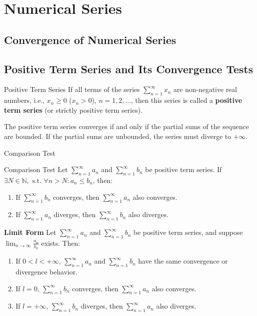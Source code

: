 \documentclass[11pt]{../../TexTemplate/elegantbook}
\begin{document}
\chapter{Numerical Series}
\section{Convergence of Numerical Series}

\section{Positive Term Series and Its Convergence Tests}
\begin{definition}{Positive Term Series}
    If all terms of the series \( \sum_{n=1}^{\infty} x_n \) are non-negative real numbers, 
    i.e., \( x_n \geqslant 0 \) (\( x_n > 0 \)), \( n = 1, 2, \dots \), 
    then this series is called a \textbf{positive term series} (or strictly positive term series).
\end{definition}

\begin{note}
    The positive term series converges if and only if the partial sums of the sequence are bounded. 
    If the partial sums are unbounded, the series must diverge to \( +\infty \).
\end{note}

\begin{leftbarTitle}{Comparison Test}\end{leftbarTitle}
\begin{theorem}{Comparison Test}
    Let \( \sum_{n=1}^{\infty} a_n \) and \( \sum_{n=1}^{\infty} b_n \) be positive term series. 
    If \( \exists N \in \mathbb{N}, \text{ s.t. } \forall n > N: a_n \leqslant b_n \), then:
    \begin{enumerate}
        \item If \( \sum_{n=1}^{\infty} b_n \) converges, then \( \sum_{n=1}^{\infty} a_n \) also converges.
        \item If \( \sum_{n=1}^{\infty} a_n \) diverges, then \( \sum_{n=1}^{\infty} b_n \) also diverges.
    \end{enumerate}

    \textbf{Limit Form}
    Let \( \sum_{n=1}^{\infty} a_n \) and \( \sum_{n=1}^{\infty} b_n \) be positive term series, 
    and suppose \( \lim_{n \to \infty} \frac{a_n}{b_n} \) exists. Then:

    \begin{enumerate}
        \item If \( 0 < l < +\infty \), \( \sum_{n=1}^{\infty} a_n \) and \( \sum_{n=1}^{\infty} b_n \) 
            have the same convergence or divergence behavior.
        \item If \( l = 0 \), \( \sum_{n=1}^{\infty} b_n \) converges, 
            then \( \sum_{n=1}^{\infty} a_n \) also converges.
        \item If \( l = +\infty \), \( \sum_{n=1}^{\infty} b_n \) diverges, 
            then \( \sum_{n=1}^{\infty} a_n \) also diverges.
    \end{enumerate}
\end{theorem}
\end{document}
